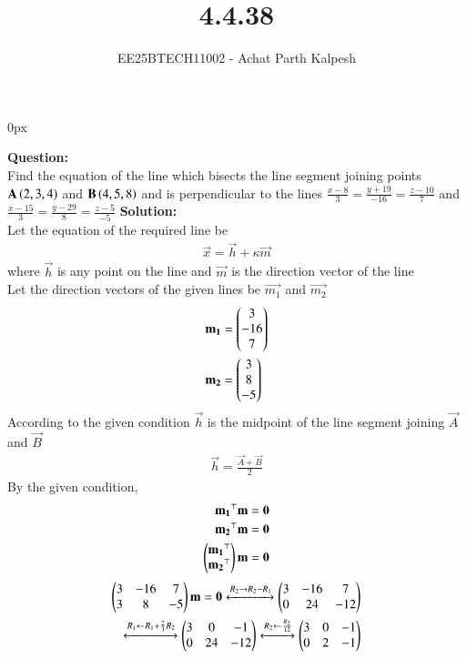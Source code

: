 \documentclass[journal]{IEEEtran}
\begin{document}

\title{4.4.38}
\author{EE25BTECH11002 - Achat Parth Kalpesh }
{\let\newpage\relax\maketitle}
\renewcommand{\thefigure}{\theenumi}
\renewcommand{\thetable}{\theenumi}
\setlength{\intextsep}{10pt} %
\renewcommand{\thetable}{\theenumi}
\parindent 0px


\textbf{Question:}\\
Find the equation of the line which bisects the line segment joining points $\mathbf{A}\left(2,3,4\right)$ and $\mathbf{B}\left(4,5,8\right)$ and is perpendicular to the lines $\frac{x-8}{3} = \frac{y+19}{-16} = \frac{z-10}{7}$ and $\frac{x-15}{3} = \frac{y-29}{8} = \frac{z-5}{-5}$
\textbf{Solution:}\\
Let the equation of the required line be 
\begin{align}
    \vec{x} = \vec{h} + \kappa \vec{m}
\end{align}
where $\vec{h}$ is any point on the line and
$\vec{m}$ is the direction vector of the line\\
Let the direction vectors of the given lines be $\vec{m_1}$ and  $\vec{m_2}$  
\begin{align}
    \mathbf{m_1} &= \begin{pmatrix}3\\-16\\7\end{pmatrix} \\
    \mathbf{m_2} &= \begin{pmatrix}3\\8\\-5\end{pmatrix}
\end{align}
According to the given condition $\vec{h}$ is the midpoint of the line segment joining  $\vec{A}$ and $\vec{B}$ 
\begin{align}
    \vec{h} = \frac{\vec{A} + \vec{B}}{2}
\end{align}
By the given condition,
\begin{align}
    \mathbf{m_1}^\top\mathbf{m} &= \mathbf{0}\\
    \mathbf{m_2}^\top\mathbf{m} &= \mathbf{0}\\
    \begin{pmatrix}\mathbf{m_1}^\top \\ \mathbf{m_2}^\top\end{pmatrix} \mathbf{m} &= \mathbf{0}
\end{align}
\begin{align}
    \begin{pmatrix}3 & -16 & 7 \\ 3 & 8 & -5\end{pmatrix}\mathbf{m} = \mathbf{0} \xleftrightarrow[]
    {R_2\rightarrow R_2 - R_1} \begin{pmatrix}3 & -16 & 7 \\ 0 & 24 & -12\end{pmatrix}\\ 
    \xleftrightarrow[]{R_1\leftarrow R_1 + \frac{2}{3}R_2} \begin{pmatrix}3 & 0 & -1 \\ 0 & 24 & -12\end{pmatrix} \xleftrightarrow[]{R_2\leftarrow \frac{R_2}{12}}\begin{pmatrix}3 & 0 & -1 \\ 0 & 2 & -1\end{pmatrix}
\end{align}
\end{document}
